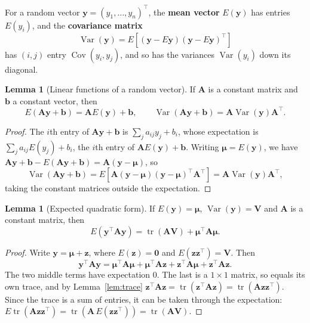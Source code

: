 \documentclass[11pt,a4paper]{article}
\numberwithin{equation}{section}
\theoremstyle{definition}
\newtheorem{lem}[thm]{Lemma}
\begin{document}
For a random vector $\mathbf{y} = (y_1, \dots, y_n)^\top$, the \textbf{mean vector}
$E(\mathbf{y})$ has entries $E(y_i)$, and the \textbf{covariance matrix}
\[
\operatorname{Var}(\mathbf{y}) = E\left[ (\mathbf{y} - E\mathbf{y})(\mathbf{y} - E\mathbf{y})^\top \right]
\]
has $(i,j)$ entry $\operatorname{Cov}(y_i, y_j)$, and so has the variances
$\operatorname{Var}(y_i)$ down its diagonal.

\begin{lem}[Linear functions of a random vector]\label{lem:linear-rv}
If $\mathbf{A}$ is a constant matrix and $\mathbf{b}$ a constant vector, then
\[
E(\mathbf{A}\mathbf{y} + \mathbf{b}) = \mathbf{A}E(\mathbf{y}) + \mathbf{b},
\qquad
\operatorname{Var}(\mathbf{A}\mathbf{y} + \mathbf{b}) = \mathbf{A} \operatorname{Var}(\mathbf{y}) \mathbf{A}^\top .
\]
\end{lem}

\begin{proof}
The $i$th entry of $\mathbf{Ay} + \mathbf{b}$ is $\sum_j a_{ij} y_j + b_i$, whose expectation
is $\sum_j a_{ij} E(y_j) + b_i$, the $i$th entry of $\mathbf{A}E(\mathbf{y}) + \mathbf{b}$.
Writing $\boldsymbol\mu = E(\mathbf{y})$, we have
$\mathbf{Ay} + \mathbf{b} - E(\mathbf{Ay} + \mathbf{b}) = \mathbf{A}(\mathbf{y} - \boldsymbol\mu)$, so
\[
\operatorname{Var}(\mathbf{Ay} + \mathbf{b})
= E\left[ \mathbf{A}(\mathbf{y} - \boldsymbol\mu)(\mathbf{y} - \boldsymbol\mu)^\top \mathbf{A}^\top \right]
= \mathbf{A} \operatorname{Var}(\mathbf{y}) \mathbf{A}^\top ,
\]
taking the constant matrices outside the expectation.
\end{proof}

\begin{lem}[Expected quadratic form]\label{lem:quad-form}
If $E(\mathbf{y}) = \boldsymbol\mu$, $\operatorname{Var}(\mathbf{y}) = \mathbf{V}$ and
$\mathbf{A}$ is a constant matrix, then
\[
E(\mathbf{y}^\top \mathbf{A} \mathbf{y}) = \operatorname{tr}(\mathbf{AV}) + \boldsymbol\mu^\top \mathbf{A} \boldsymbol\mu .
\]
\end{lem}

\begin{proof}
Write $\mathbf{y} = \boldsymbol\mu + \mathbf{z}$, where $E(\mathbf{z}) = \mathbf{0}$ and
$E(\mathbf{z}\mathbf{z}^\top) = \mathbf{V}$. Then
\[
\mathbf{y}^\top \mathbf{A} \mathbf{y}
= \boldsymbol\mu^\top \mathbf{A} \boldsymbol\mu + \boldsymbol\mu^\top \mathbf{A} \mathbf{z}
  + \mathbf{z}^\top \mathbf{A} \boldsymbol\mu + \mathbf{z}^\top \mathbf{A} \mathbf{z} .
\]
The two middle terms have expectation $0$. The last is a $1 \times 1$ matrix, so equals its
own trace, and by Lemma~\ref{lem:trace}
$\mathbf{z}^\top \mathbf{A} \mathbf{z} = \operatorname{tr}(\mathbf{z}^\top \mathbf{A} \mathbf{z}) = \operatorname{tr}(\mathbf{A} \mathbf{z}\mathbf{z}^\top)$.
Since the trace is a sum of entries, it can be taken through the expectation:
$E\operatorname{tr}(\mathbf{A}\mathbf{z}\mathbf{z}^\top) = \operatorname{tr}(\mathbf{A}\,E(\mathbf{z}\mathbf{z}^\top)) = \operatorname{tr}(\mathbf{AV})$.
\end{proof}
\end{document}
